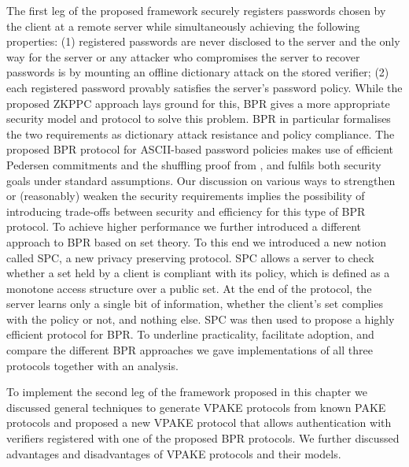 The first leg of the proposed framework securely registers passwords chosen by the client at a remote server while simultaneously achieving the following properties: (1) registered passwords are never disclosed to the server and the only way for the server or any attacker who compromises the server to recover passwords is by mounting an offline dictionary attack on the stored verifier; (2) each registered password provably satisfies the server's password policy. 
While the proposed \ac{ZKPPC} approach lays ground for this, \ac{BPR} gives a more appropriate security model and protocol to solve this problem.
\ac{BPR} in particular formalises the two requirements as dictionary attack resistance and policy compliance.
The proposed \ac{BPR} protocol for \ac{ASCII}-based password policies makes use of efficient Pedersen commitments and the shuffling proof from \cite{Furukawa05}, and fulfils both security goals under standard assumptions.
Our discussion on various ways to strengthen or (reasonably) weaken the security requirements implies the possibility of introducing trade-offs between security and efficiency for this type of \ac{BPR} protocol.
To achieve higher performance we further introduced a different approach to \ac{BPR} based on set theory.
To this end we introduced a new notion called \acl{SPC}, a new privacy preserving protocol. 
\ac{SPC} allows a server to check whether a set held by a client is compliant with its policy, which is defined as a monotone access structure over a public set. 
At the end of the protocol, the server learns only a single bit of information, \ie whether the client's set complies with the policy or not, and nothing else. 
\ac{SPC} was then used to propose a highly efficient protocol for \ac{BPR}.
To underline practicality, facilitate adoption, and compare the different \ac{BPR} approaches we gave implementations of all three protocols together with an analysis.

To implement the second leg of the framework proposed in this chapter we discussed general techniques to generate \ac{VPAKE} protocols from known \ac{PAKE} protocols and proposed a new \ac{VPAKE} protocol that allows authentication with verifiers registered with one of the proposed \ac{BPR} protocols.
We further discussed advantages and disadvantages of \ac{VPAKE} protocols and their models.
